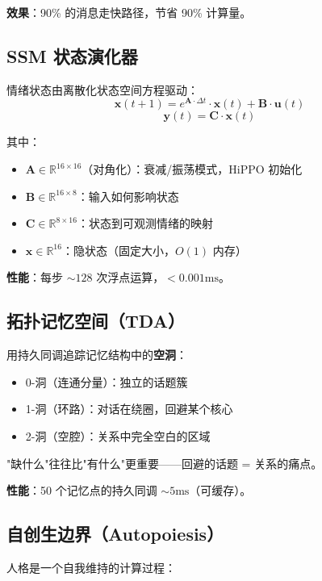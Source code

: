 \documentclass[11pt,a4paper]{article}
\begin{document}
\textbf{效果}：90\% 的消息走快路径，节省 90\% 计算量。

\subsection{SSM 状态演化器}

情绪状态由离散化状态空间方程驱动：
\[
\mathbf{x}(t+1) = e^{\mathbf{A} \cdot \Delta t} \cdot \mathbf{x}(t) + \mathbf{B} \cdot \mathbf{u}(t)
\]
\[
\mathbf{y}(t) = \mathbf{C} \cdot \mathbf{x}(t)
\]

其中：
\begin{itemize}[nosep]
  \item $\mathbf{A} \in \mathbb{R}^{16 \times 16}$（对角化）：衰减/振荡模式，HiPPO 初始化
  \item $\mathbf{B} \in \mathbb{R}^{16 \times 8}$：输入如何影响状态
  \item $\mathbf{C} \in \mathbb{R}^{8 \times 16}$：状态到可观测情绪的映射
  \item $\mathbf{x} \in \mathbb{R}^{16}$：隐状态（固定大小，$O(1)$ 内存）
\end{itemize}

\textbf{性能}：每步 $\sim 128$ 次浮点运算，$< 0.001\text{ms}$。

\subsection{拓扑记忆空间（TDA）}

用持久同调追踪记忆结构中的\textbf{空洞}：

\begin{itemize}[nosep]
  \item 0-洞（连通分量）：独立的话题簇
  \item 1-洞（环路）：对话在绕圈，回避某个核心
  \item 2-洞（空腔）：关系中完全空白的区域
\end{itemize}

"缺什么"往往比"有什么"更重要——回避的话题 = 关系的痛点。

\textbf{性能}：50 个记忆点的持久同调 $\sim 5\text{ms}$（可缓存）。

\subsection{自创生边界（Autopoiesis）}

人格是一个自我维持的计算过程：
\end{document}
